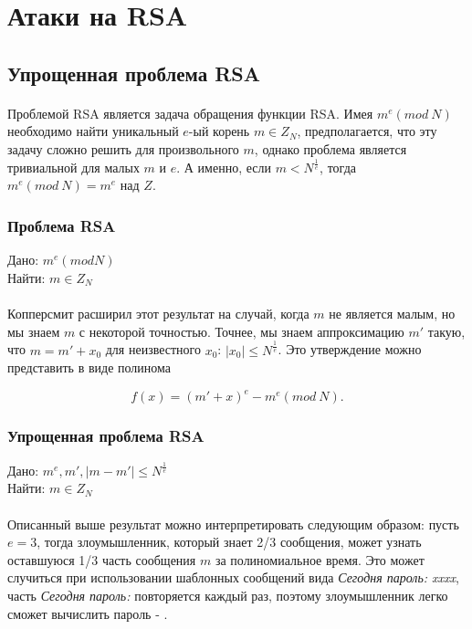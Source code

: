 
\section{Атаки на RSA}

\subsection{Упрощенная проблема RSA}

\paragraph{} Проблемой RSA является задача обращения функции RSA. Имея {$m^e (mod \: N)$} необходимо найти уникальный {$e$}-ый корень {$m \in Z_N$}, 
  предполагается, что эту задачу сложно решить для произвольного {$m$}, однако проблема является тривиальной для малых {$m$} и {$e$}. А именно, если
  {$m < N^\frac{1}{e}$}, тогда {$m^e (mod \: N) = m^e$} над {$Z$}.
  
  \subsubsection{Проблема RSA}
  Дано: {$m^e (mod N)$} \\   
  Найти: {$m \in Z_N$}
  
\paragraph{} Копперсмит расширил этот результат на случай, когда {$m$} не является малым, но мы знаем {$m$} с некоторой точностью. Точнее, мы знаем аппроксимацию
  {$m'$} такую, что {$m = m' + x_0$} для неизвестного {$x_0$}: {$|x_0| \le N^\frac{1}{e}$}. Это утверждение можно представить в виде полинома
  
    \begin{equation}
     f(x) = (m' + x)^e - m^e (mod \: N).
    \end{equation}
    
  \subsubsection{Упрощенная проблема RSA}
  Дано: {$m^e, m', |m-m'| \le N^\frac{1}{e}$} \\   
  Найти: {$m \in Z_N$}  
  
\paragraph{} Описанный выше результат можно интерпретировать следующим образом: пусть {$e = 3$}, тогда злоумышленник, который знает 2/3 сообщения, может узнать оставшуюся
  1/3 часть сообщения {$m$} за полиномиальное время. Это может случиться при использовании шаблонных сообщений вида \textit{Сегодня пароль: xxxx}, часть 
  \textit{Сегодня пароль:} повторяется каждый раз, поэтому злоумышленник легко сможет вычислить пароль - \cite[страницы 328-329]{may10}.

